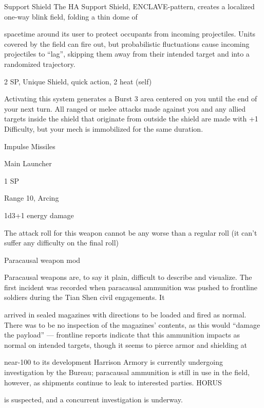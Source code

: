 Support Shield  
The HA Support Shield, ENCLAVE-pattern, creates a localized one-way blink field, folding a thin dome of  

spacetime around its user to protect occupants from incoming projectiles. Units covered by the field can  
fire out, but probabilistic fluctuations cause incoming projectiles to “lag”, skipping them away from their  
intended target and into a randomized trajectory.   

2 SP, Unique  
Shield, quick action, 2 heat (self)
 

Activating this system generates a Burst 3 area centered on you until the end of your next turn.  
All ranged or melee attacks made against you and any allied targets inside the shield that  
originate from outside the shield are made with +1 Difficulty, but your mech is immobilized for the  
same duration.
 

Impulse Missiles  

Main Launcher
 
1 SP
 
Range 10, Arcing
 
1d3+1 energy damage
 
The attack roll for this weapon cannot be any worse than a regular roll (it can’t suffer any  
difficulty on the final roll)
 

Paracausal weapon mod  

Paracausal weapons are, to say it plain, difficult to describe and visualize. The first incident was recorded  
when paracausal ammunition was pushed to frontline soldiers during the Tian Shen civil engagements. It  

arrived in sealed magazines with directions to be loaded and fired as normal. There was to be no inspection  
of the magazines’ contents, as this would “damage the payload” — frontline reports indicate that this  
ammunition impacts as normal on intended targets, though it seems to pierce armor and shielding at  

                                                                                                                 


near-100%
to its development Harrison Armory is currently undergoing investigation by the Bureau; paracausal  
ammunition is still in use in the field, however, as shipments continue to leak to interested parties. HORUS  

is suspected, and a concurrent investigation is underway.    

